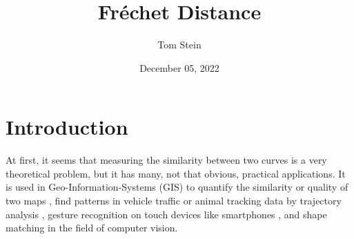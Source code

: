\documentclass[
oneside,
fontsize=11pt
]{scrartcl}
\title{Fréchet Distance}
\author{Tom Stein}
\date{December 05, 2022}
\begin{document}


%






\newpage

 




\section{Introduction}
At first, it seems that measuring the similarity between two curves
is a very theoretical problem, but it has many, not that obvious, practical applications.
It is used in Geo-Information-Systems (GIS) to 
quantify the similarity or quality of two maps \cite{lyu_partial-frechet-distance-based_2022},
find patterns in vehicle traffic or animal tracking data 
by trajectory analysis \cite{buchin_detecting_2011},
gesture recognition on touch devices like smartphones \cite{hu_research_2022},
and shape matching in the field of computer vision. 
\end{document}
